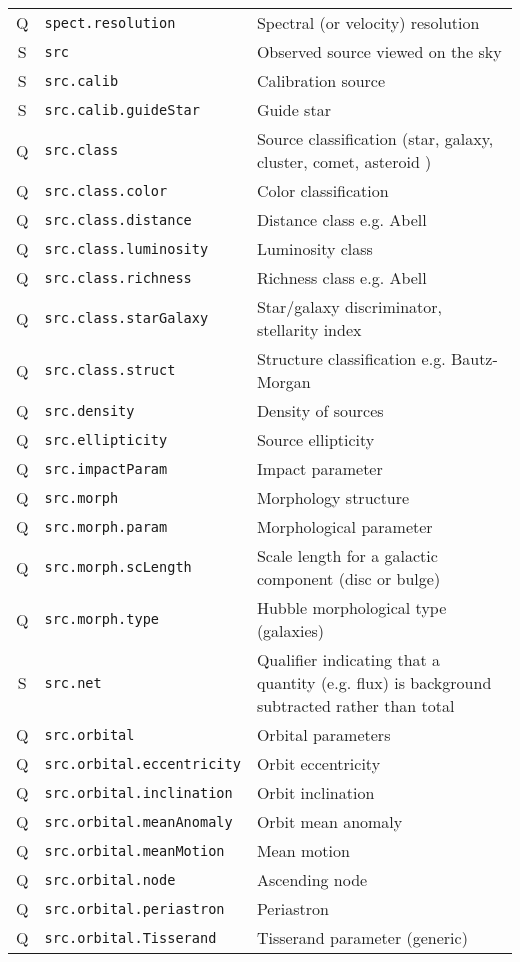 \documentclass[11pt,a4paper]{ivoa}
\begin{document}
\begin{longtable}[h!]{c|p{40ex}|p{}}
Q & {\tt spect.resolution} & Spectral (or velocity) resolution\\
S & {\tt src} & Observed source viewed on the sky\\
S & {\tt src.calib} & Calibration source\\
S & {\tt src.calib.guideStar} & Guide star\\
Q & {\tt src.class} & Source classification (star, galaxy, cluster, comet, asteroid )\\
Q & {\tt src.class.color} & Color classification\\
Q & {\tt src.class.distance} & Distance class e.g. Abell\\
Q & {\tt src.class.luminosity} & Luminosity class\\
Q & {\tt src.class.richness} & Richness class e.g. Abell\\
Q & {\tt src.class.starGalaxy} & Star/galaxy discriminator, stellarity index\\
Q & {\tt src.class.struct} & Structure classification e.g. Bautz-Morgan\\
Q & {\tt src.density} & Density of sources\\
Q & {\tt src.ellipticity} & Source ellipticity\\
Q & {\tt src.impactParam} & Impact parameter\\
Q & {\tt src.morph} & Morphology structure\\
Q & {\tt src.morph.param} & Morphological parameter\\
Q & {\tt src.morph.scLength} & Scale length for a galactic component (disc or bulge)\\
Q & {\tt src.morph.type} & Hubble morphological type (galaxies)\\
S & {\tt src.net} & Qualifier indicating that a quantity (e.g. flux) is background subtracted rather than total\\
Q & {\tt src.orbital} & Orbital parameters\\
Q & {\tt src.orbital.eccentricity} & Orbit eccentricity\\
Q & {\tt src.orbital.inclination} & Orbit inclination\\
Q & {\tt src.orbital.meanAnomaly} & Orbit mean anomaly\\
Q & {\tt src.orbital.meanMotion} & Mean motion\\
Q & {\tt src.orbital.node} & Ascending node\\
Q & {\tt src.orbital.periastron} & Periastron\\
Q & {\tt src.orbital.Tisserand} & Tisserand parameter (generic)\\

\end{longtable}
\end{document}
